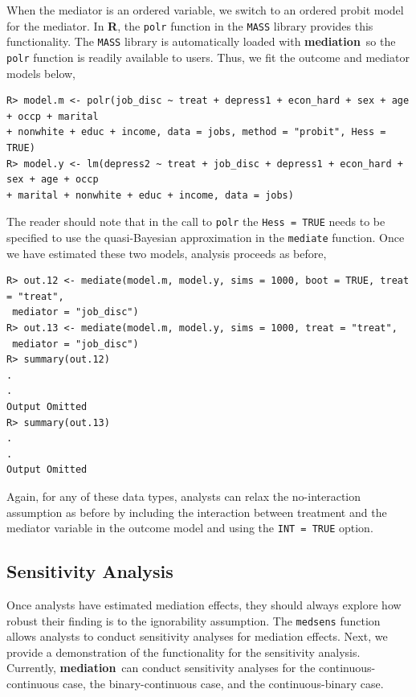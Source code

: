 \documentclass[11pt,letterpaper]{article}
\theoremstyle{plain}
\newcommand\bR{{\bf R}}
\newcommand\bmediation{{\bf mediation}}
\begin{document}
When the mediator is an ordered variable, we switch to an ordered
probit model for the mediator.  In \bR, the \texttt{polr} function
in the \texttt{MASS} library provides this functionality.  The
\texttt{MASS} library is automatically loaded with \bmediation\, so
the \texttt{polr} function is readily available to users.  Thus, we
fit the outcome and mediator models below,

\begin{verbatim}
R> model.m <- polr(job_disc ~ treat + depress1 + econ_hard + sex + age + occp + marital
+ nonwhite + educ + income, data = jobs, method = "probit", Hess = TRUE)
R> model.y <- lm(depress2 ~ treat + job_disc + depress1 + econ_hard + sex + age + occp
+ marital + nonwhite + educ + income, data = jobs)
\end{verbatim}

The reader should note that in the call to \texttt{polr} the
\texttt{Hess = TRUE} needs to be specified to use the quasi-Bayesian
approximation in the \texttt{mediate} function.  Once we have
estimated these two models, analysis proceeds as before,
\begin{verbatim}
R> out.12 <- mediate(model.m, model.y, sims = 1000, boot = TRUE, treat = "treat",
 mediator = "job_disc")
R> out.13 <- mediate(model.m, model.y, sims = 1000, treat = "treat",
 mediator = "job_disc")
R> summary(out.12)
.
.
Output Omitted
R> summary(out.13)
.
.
Output Omitted
\end{verbatim}
Again, for any of these data types, analysts can relax the
no-interaction assumption as before by including the interaction
between treatment and the mediator variable in the outcome model and
using the \texttt{INT = TRUE} option.

\subsection{Sensitivity Analysis}

Once analysts have estimated mediation effects, they should always
explore how robust their finding is to the ignorability assumption.
The \texttt{medsens} function allows analysts to conduct sensitivity
analyses for mediation effects.  Next, we provide a demonstration of
the functionality for the sensitivity analysis.  Currently,
\bmediation\ can conduct sensitivity analyses for the
continuous-continuous case, the binary-continuous case, and the
continuous-binary case.
\end{document}
